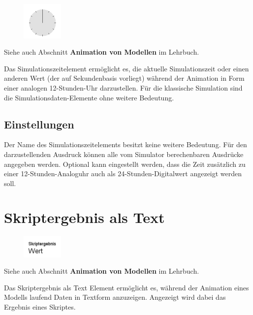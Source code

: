 \begin{figure}
\vspace{-22pt}
\includegraphics[width=2cm]{imageModelElementAnimationClock.png}
\vspace{-22pt}
\end{figure}

Siehe auch Abschnitt \textbf{Animation von Modellen} im Lehrbuch.

Das Simulationszeitelement ermöglicht es, die aktuelle Simulationszeit oder einen anderen Wert
(der auf Sekundenbasis vorliegt) während der Animation in Form einer analogen 12-Stunden-Uhr darzustellen.
Für die klassische Simulation sind die Simulationsdaten-Elemente ohne weitere Bedeutung.

\subsection*{Einstellungen}

Der Name des Simulationszeitelements besitzt keine weitere Bedeutung.
Für den darzustellenden Ausdruck können alle vom Simulator berechenbaren Ausdrücke angegeben werden.
Optional kann eingestellt werden, dass die Zeit zusätzlich zu einer 12-Stunden-Analoguhr auch als 24-Stunden-Digitalwert angezeigt werden soll.


\section{Skriptergebnis als Text}
\label{ref:ModelElementAnimationTextJS}

\begin{figure}
\vspace{-22pt}
\includegraphics[width=2cm]{imageModelElementAnimationTextJS.png}
\vspace{-22pt}
\end{figure}

Siehe auch Abschnitt \textbf{Animation von Modellen} im Lehrbuch.

Das Skriptergebnis als Text Element ermöglicht es, während der Animation eines Modells laufend Daten in Textform anzuzeigen.
Angezeigt wird dabei das Ergebnis eines Skriptes.

